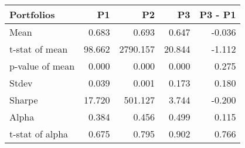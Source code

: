 \begin{tabular}{lrrrr}
\toprule
Portfolios & P1 & P2 & P3 & P3 - P1 \\
\midrule
Mean & 0.683 & 0.693 & 0.647 & -0.036 \\
t-stat of mean & 98.662 & 2790.157 & 20.844 & -1.112 \\
p-value of mean & 0.000 & 0.000 & 0.000 & 0.275 \\
Stdev & 0.039 & 0.001 & 0.173 & 0.180 \\
Sharpe & 17.720 & 501.127 & 3.744 & -0.200 \\
Alpha & 0.384 & 0.456 & 0.499 & 0.115 \\
t-stat of alpha & 0.675 & 0.795 & 0.902 & 0.766 \\
\bottomrule
\end{tabular}
